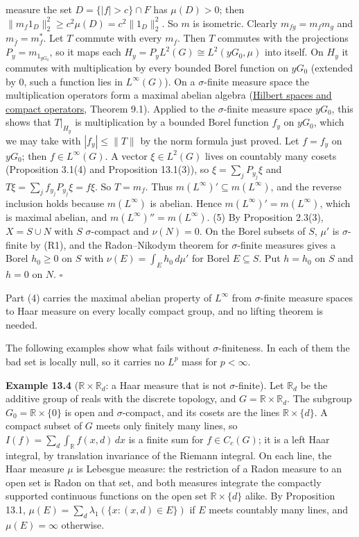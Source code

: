 \documentclass[
  english,
  11pt,
  a4paper,
]{article}
\begin{document}
measure the set \(D=\{|f|>c\}\cap F\) has \(\mu(D)>0\); then
\(\|m_f1_D\|_2^2\geq c^2\mu(D)=c^2\|1_D\|_2^2\). So \(m\) is isometric.
Clearly \(m_{fg}=m_fm_g\) and \(m_{\bar f}=m_f^*\). Let \(T\) commute
with every \(m_f\). Then \(T\) commutes with the projections
\(P_y=m_{1_{yG_0}}\), so it maps each
\(H_y=P_yL^2(G)\cong L^2(yG_0,\mu)\) into itself. On \(H_y\) it commutes
with multiplication by every bounded Borel function on \(yG_0\)
(extended by \(0\), such a function lies in \(L^\infty(G)\)). On a
\(\sigma\)-finite measure space the multiplication operators form a
maximal abelian algebra
(\hyperref[hilbert-spaces-and-compact-operators]{Hilbert spaces and
compact operators}, Theorem 9.1). Applied to the \(\sigma\)-finite
measure space \(yG_0\), this shows that \(T|_{H_y}\) is multiplication
by a bounded Borel function \(f_y\) on \(yG_0\), which we may take with
\(|f_y|\leq\|T\|\) by the norm formula just proved. Let \(f=f_y\) on
\(yG_0\); then \(f\in L^\infty(G)\). A vector \(\xi\in L^2(G)\) lives on
countably many cosets (Proposition 3.1(4) and Proposition 13.1(3)), so
\(\xi=\sum_jP_{y_j}\xi\) and \(T\xi=\sum_jf_{y_j}P_{y_j}\xi=f\xi\). So
\(T=m_f\). Thus \(m(L^\infty)'\subseteq m(L^\infty)\), and the reverse
inclusion holds because \(m(L^\infty)\) is abelian. Hence
\(m(L^\infty)'=m(L^\infty)\), which is maximal abelian, and
\(m(L^\infty)''=m(L^\infty)\). (5) By Proposition 2.3(3), \(X=S\cup N\)
with \(S\) \(\sigma\)-compact and \(\nu(N)=0\). On the Borel subsets of
\(S\), \(\mu'\) is \(\sigma\)-finite by (R1), and the Radon--Nikodym
theorem for \(\sigma\)-finite measures gives a Borel \(h_0\geq0\) on
\(S\) with \(\nu(E)=\int_Eh_0\,d\mu'\) for Borel \(E\subseteq S\). Put
\(h=h_0\) on \(S\) and \(h=0\) on \(N\). \(\square\)

Part (4) carries the maximal abelian property of \(L^\infty\) from
\(\sigma\)-finite measure spaces to Haar measure on every locally
compact group, and no lifting theorem is needed.

The following examples show what fails without \(\sigma\)-finiteness. In
each of them the bad set is locally null, so it carries no \(L^p\) mass
for \(p<\infty\).

\textbf{Example 13.4} (\(\mathbb R\times\mathbb R_d\): a Haar measure
that is not \(\sigma\)-finite). Let \(\mathbb R_d\) be the additive
group of reals with the discrete topology, and
\(G=\mathbb R\times\mathbb R_d\). The subgroup
\(G_0=\mathbb R\times\{0\}\) is open and \(\sigma\)-compact, and its
cosets are the lines \(\mathbb R\times\{d\}\). A compact subset of \(G\)
meets only finitely many lines, so
\(I(f)=\sum_d\int_{\mathbb R}f(x,d)\,dx\) is a finite sum for
\(f\in C_c(G)\); it is a left Haar integral, by translation invariance
of the Riemann integral. On each line, the Haar measure \(\mu\) is
Lebesgue measure: the restriction of a Radon measure to an open set is
Radon on that set, and both measures integrate the compactly supported
continuous functions on the open set \(\mathbb R\times\{d\}\) alike. By
Proposition 13.1, \(\mu(E)=\sum_d\lambda_1(\{x:(x,d)\in E\})\) if \(E\)
meets countably many lines, and \(\mu(E)=\infty\) otherwise.
\end{document}
